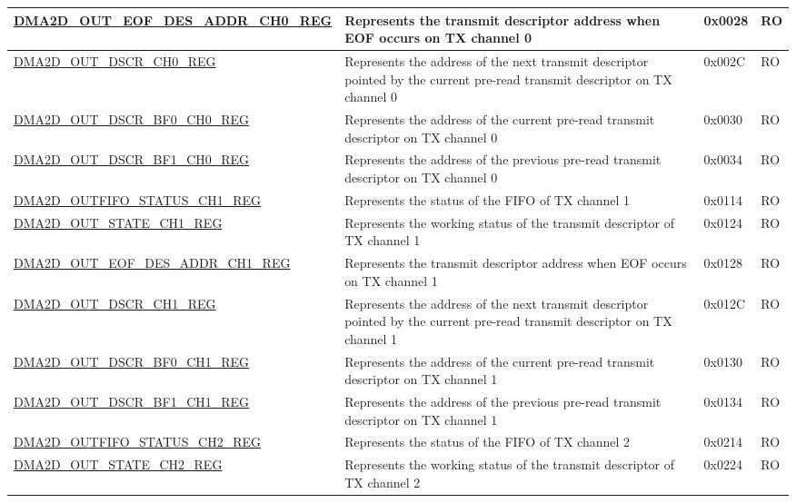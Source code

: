 \begin{longtable}{ | p{7cm} | p{11.5cm} | p{1.3cm} | p{2cm} | }
\hyperref[regdesc:DMA2DOUTEOFDESADDRCHNREG]{DMA2D\_OUT\_EOF\_DES\_ADDR\_CH0\_REG} & Represents the transmit descriptor address when EOF occurs on TX channel 0 & 0x0028 & RO \\ \hline
\hyperref[regdesc:DMA2DOUTDSCRCHNREG]{DMA2D\_OUT\_DSCR\_CH0\_REG} & Represents the address of the next transmit descriptor pointed by the current pre-read transmit descriptor on TX channel 0 & 0x002C & RO \\ \hline
\hyperref[regdesc:DMA2DOUTDSCRBF0CHNREG]{DMA2D\_OUT\_DSCR\_BF0\_CH0\_REG} & Represents the address of the current pre-read transmit descriptor on TX channel 0 & 0x0030 & RO \\ \hline
\hyperref[regdesc:DMA2DOUTDSCRBF1CHNREG]{DMA2D\_OUT\_DSCR\_BF1\_CH0\_REG} & Represents the address of the previous pre-read transmit descriptor on TX channel 0 & 0x0034 & RO \\ \hline
\hyperref[regdesc:DMA2DOUTFIFOSTATUSCHNREG]{DMA2D\_OUTFIFO\_STATUS\_CH1\_REG} & Represents the status of the FIFO of TX channel 1 & 0x0114 & RO \\ \hline
\hyperref[regdesc:DMA2DOUTSTATECHNREG]{DMA2D\_OUT\_STATE\_CH1\_REG} & Represents the working status of the transmit descriptor of TX channel 1 & 0x0124 & RO \\ \hline
\hyperref[regdesc:DMA2DOUTEOFDESADDRCHNREG]{DMA2D\_OUT\_EOF\_DES\_ADDR\_CH1\_REG} & Represents the transmit descriptor address when EOF occurs on TX channel 1 & 0x0128 & RO \\ \hline
\hyperref[regdesc:DMA2DOUTDSCRCHNREG]{DMA2D\_OUT\_DSCR\_CH1\_REG} & Represents the address of the next transmit descriptor pointed by the current pre-read transmit descriptor on TX channel 1 & 0x012C & RO \\ \hline
\hyperref[regdesc:DMA2DOUTDSCRBF0CHNREG]{DMA2D\_OUT\_DSCR\_BF0\_CH1\_REG} & Represents the address of the current pre-read transmit descriptor on TX channel 1 & 0x0130 & RO \\ \hline
\hyperref[regdesc:DMA2DOUTDSCRBF1CHNREG]{DMA2D\_OUT\_DSCR\_BF1\_CH1\_REG} & Represents the address of the previous pre-read transmit descriptor on TX channel 1 & 0x0134 & RO \\ \hline
\hyperref[regdesc:DMA2DOUTFIFOSTATUSCHNREG]{DMA2D\_OUTFIFO\_STATUS\_CH2\_REG} & Represents the status of the FIFO of TX channel 2 & 0x0214 & RO \\ \hline
\hyperref[regdesc:DMA2DOUTSTATECHNREG]{DMA2D\_OUT\_STATE\_CH2\_REG} & Represents the working status of the transmit descriptor of TX channel 2 & 0x0224 & RO \\ \hline

\end{longtable}
